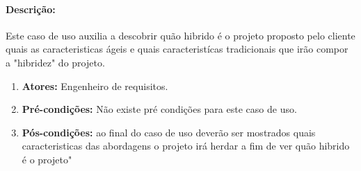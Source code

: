 \paragraph{Descrição:}
Este caso de uso auxilia a descobrir quão hibrido é o projeto proposto pelo cliente quais as caracteristicas ágeis e quais caracteristícas tradicionais que irão compor a "hibridez" do projeto.

\begin{enumerate}
	\item \textbf{Atores:}
		Engenheiro de requisitos. 
	\item \textbf{Pré-condições:}
		Não existe pré condições para este caso de uso.
	\item \textbf{Pós-condições:}
		ao final do caso de uso deverão ser mostrados quais caracteristicas das abordagens o projeto irá herdar a fim de ver quão hibrido é o projeto" 
\end{enumerate}
